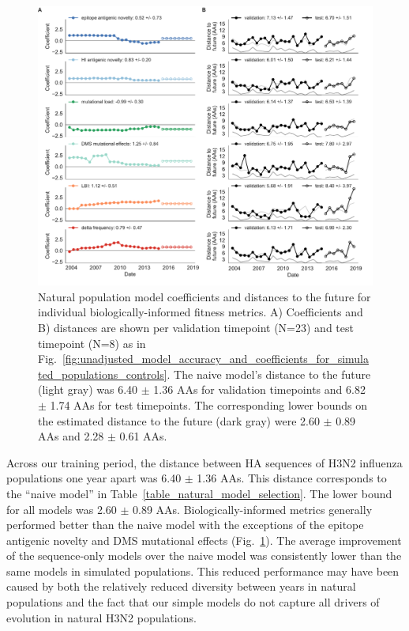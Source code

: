 \begin{figure}[htb]
  \begin{center}
  \includegraphics[width=\textwidth]{figures/unadjusted-model-accuracy-and-coefficients-for-natural-populations.pdf}
  \caption{
    Natural population model coefficients and distances to the future for individual biologically-informed fitness metrics.
    A) Coefficients and B) distances are shown per validation timepoint (N=23) and test timepoint (N=8) as in Fig.~\ref{fig:unadjusted_model_accuracy_and_coefficients_for_simulated_populations_controls}.
    The naive model's distance to the future (light gray) was 6.40 $\pm$ 1.36 AAs for validation timepoints and 6.82 $\pm$ 1.74 AAs for test timepoints.
    The corresponding lower bounds on the estimated distance to the future (dark gray) were 2.60 $\pm$ 0.89 AAs and 2.28 $\pm$ 0.61 AAs.
  }
  \label{fig:unadjusted_model_accuracy_and_coefficients_for_natural_populations}
  \end{center}
\end{figure}

Across our training period, the distance between HA sequences of H3N2 influenza populations one year apart was 6.40 $\pm$ 1.36 AAs.
This distance corresponds to the ``naive model'' in Table~\ref{table_natural_model_selection}.
The lower bound for all models was 2.60 $\pm$ 0.89 AAs.
Biologically-informed metrics generally performed better than the naive model with the exceptions of the epitope antigenic novelty and DMS mutational effects (Fig.~\ref{fig:unadjusted_model_accuracy_and_coefficients_for_natural_populations}).
The average improvement of the sequence-only models over the naive model was consistently lower than the same models in simulated populations.
This reduced performance may have been caused by both the relatively reduced diversity between years in natural populations and the fact that our simple models do not capture all drivers of evolution in natural H3N2 populations.

